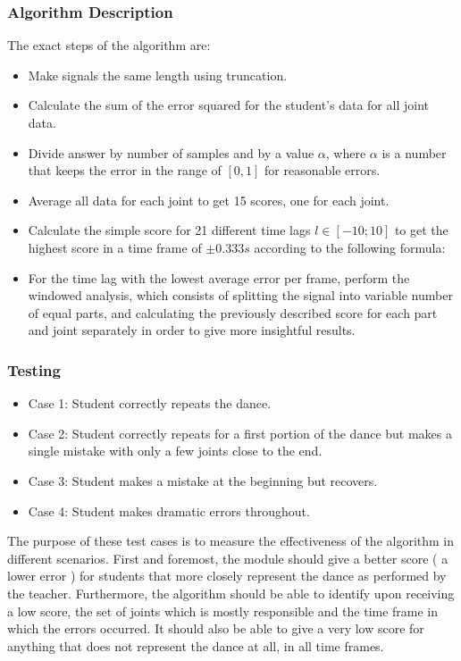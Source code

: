 \documentclass[a4paper]{article}
\begin{document}
\subsubsection{Algorithm Description}
\noindent
 The exact steps of the algorithm are:
\begin{itemize}
\setlength{\itemsep}{1pt}
\setlength{\parskip}{0pt}
\setlength{\parsep}{0pt}
	\item Make signals the same length using truncation.
	\item Calculate the sum of the error squared for the student's data for all joint data.
	\item Divide answer by number of samples and by a value $\alpha$, where $\alpha$ is a number that keeps the error in the range of $[0, 1]$ for reasonable errors. 
	\item Average all data for each joint to get 15 scores, one for each joint.
	\item Calculate the simple score for 21 different time lags $l \in [-10;10]$ to get the highest score in a time frame of $\pm 0.333s$
 according to the following formula:
	\item For the time lag with the lowest average error per frame, perform the windowed analysis, which consists of splitting the signal into variable number of equal parts, and calculating the previously described score for each part and joint separately in order to give more insightful results. 
\end{itemize}
\subsubsection{Testing}
\begin{itemize}
\item{Case 1: Student correctly repeats the dance.}
\item{Case 2: Student correctly repeats for a first portion of the dance but makes a single mistake with only a few joints close to the end.}
\item{Case 3: Student makes a mistake at the beginning but recovers.}
\item{Case 4: Student makes dramatic errors throughout.}
\end{itemize}

\noindent
The purpose of these test cases is to measure the effectiveness of the algorithm in different scenarios. First and foremost, the module should give a better score ( a lower error ) for students that more closely represent the dance as performed by the teacher. Furthermore, the algorithm should be able to identify upon receiving a low score,  the set of joints which is mostly responsible and the time frame in which the errors occurred. It should also be able to give a very low score for anything that does not represent the dance at all, in all time frames.
\end{document}
